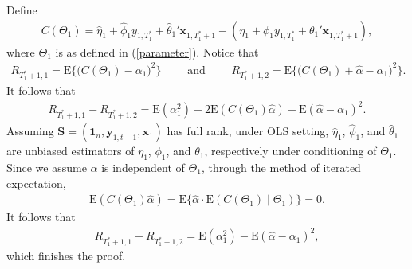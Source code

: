 \documentclass[11pt]{article}
\def\mbf#1{\mathbf{#1}} %
\def\mrm#1{\mathrm{#1}} %
\def\E#1{\mathrm{E}(#1)} %
\theoremstyle{definition}
\newenvironment{proof-of-lemma}[1][{}]{\noindent{\bf
    Proof of Lemma {#1}}
  \hspace*{.5em}}{\qed\bigskip\\}
\begin{document}
  
\begin{proof-of-lemma}[\ref{risklemma}]
  Define 
  \begin{align*}
    C(\Theta_1) =\hat{\eta}_1 +\hat{\phi}_1 y_{1, T_1^*}+\hat{\theta}_1'\mbf{x}_{1, T_1^*+1} -(\eta_1 +\phi_1y_{1,T_1^*}+\theta_1'\mbf{x}_{1,T_1^*+1}),
  \end{align*}
  where $\Theta_1$ is as defined in (\ref{parameter}). Notice that
  \begin{align*}
    R_{T_1^*+1,1}= \mrm{E}\big\{\big(C(\Theta_1)-\alpha_1\big)^2\big\}
    \qquad \text{ and } 
    \qquad  R_{T_1^*+1,2}= \mrm{E}\big\{\big(C(\Theta_1)+\hat{\alpha}-\alpha_1\big)^2\big\}.
  \end{align*}
  It follows that
  \begin{align*}
    R_{T_1^*+1,1}-R_{T_1^*+1,2}=\E{\alpha_1^2}-2\E{C(\Theta_1)\hat{\alpha}}-\E{\hat{\alpha}-\alpha_1}^2.
  \end{align*}
  Assuming $\mbf{S}=(\mbf{1}_n, \mbf{y}_{1,t-1}, \mbf{x}_{1})$ has full rank, under OLS setting, $\hat{\eta}_1$, $\hat{\phi}_1$, and $\hat{\theta}_1$ are unbiased estimators of $\eta_1$, $\phi_1$, and $\theta_1$, respectively under conditioning of $\Theta_1$. Since we assume $\hat{\alpha}$ is independent of $\Theta_1$, through the method of iterated expectation,
  \begin{align*}
    \E{C(\Theta_1)\hat{\alpha}}=\mrm{E}\big\{\hat{\alpha}\cdot \E{C(\Theta_1)\mid \Theta_1}\}=0.
  \end{align*}
  It follows that
  \begin{align*}
    R_{T_1^*+1,1}-R_{T_1^*+1,2}=\E{\alpha_1^2}-\E{\hat{\alpha}-\alpha_1}^2,
  \end{align*}
  which finishes the proof.
\end{proof-of-lemma}
\end{document}

